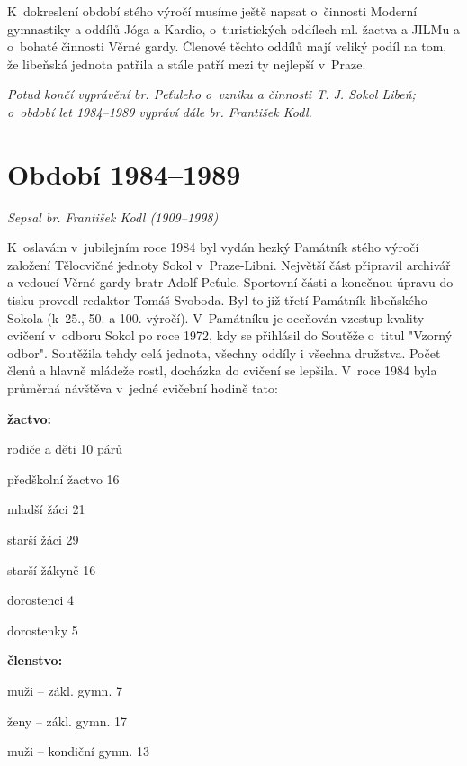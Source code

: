 \documentclass[a5paper, 11pt, twoside]{article}
\begin{document}
K~dokreslení období stého výročí musíme ještě napsat o~činnosti Moderní
gymnastiky a oddílů Jóga a Kardio, o~turistických oddílech ml. žactva a
JILMu a o~bohaté činnosti Věrné gardy. Členové těchto oddílů mají veliký
podíl na tom, že libeňská jednota patřila a stále patří mezi ty nejlepší
v~Praze.

\begin{center}
\textit{Potud končí vyprávění br. Peťuleho o~vzniku a činnosti T. J. Sokol
Libeň; o~období let 1984--1989 vypráví dále br. František Kodl.}
\end{center}

\section{Období 1984--1989}

\begin{center}
  \textit{Sepsal br. František Kodl (1909--1998)}
\end{center}

\noindent
K~oslavám v~jubilejním roce 1984 byl vydán hezký Památník stého výročí
založení Tělocvičné jednoty Sokol v~Praze-Libni. Největší část připravil
archivář a vedoucí Věrné gardy bratr Adolf Peťule. Sportovní části a
konečnou úpravu do tisku provedl redaktor Tomáš Svoboda. Byl to již
třetí Památník libeňského Sokola (k~25., 50. a 100. výročí). V~Památníku
je oceňován vzestup kvality cvičení v~odboru Sokol po roce 1972, kdy se
přihlásil do Soutěže o~titul "Vzorný odbor". Soutěžila tehdy celá
jednota, všechny oddíly i všechna družstva. Počet členů a hlavně mládeže
rostl, docházka do cvičení se lepšila. V~roce 1984 byla průměrná
návštěva v~jedné cvičební hodině tato:

\vspace*{6pt}
\textbf{žactvo:}

rodiče a děti 10 párů

předškolní žactvo 16

mladší žáci 21

starší žáci 29

starší žákyně 16

dorostenci 4

dorostenky 5


\vspace*{6pt}
\textbf{členstvo:}

muži -- zákl. gymn. 7

ženy -- zákl. gymn. 17

muži -- kondiční gymn. 13
\end{document}
